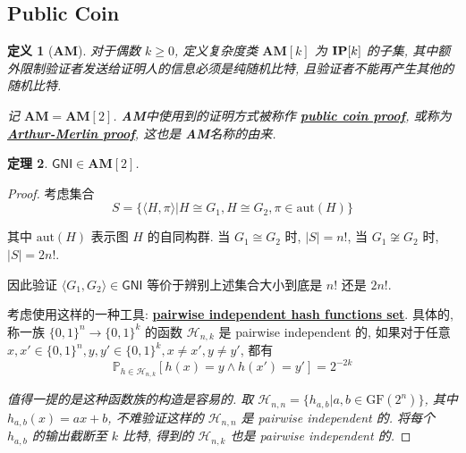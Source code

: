 \documentclass[8pt]{article}
\theoremstyle{compact}
\newtheorem{theorem}{定理}[section]
\newtheorem{definition}[theorem]{定义}
\def\obj#1{\textbf{\uline{#1}}}
\def\ge{\geqslant}
\begin{document}
\subsection{Public Coin}
\def\AM{\textbf{AM}}
\begin{definition}[\AM]
	对于偶数 $k \ge 0$, 定义复杂度类 $\AM[k]$ 为 $\textbf{IP}[k]$ 的子集, 其中额外限制验证者发送给证明人的信息必须是纯随机比特, 且验证者不能再产生其他的随机比特.

	记 $\AM = \AM[2]$. \AM 中使用到的证明方式被称作 \obj{public coin proof}, 或称为 \obj{Arthur-Merlin proof}, 这也是 \AM 名称的由来.
\end{definition}
\begin{theorem}
	$\textsf{GNI} \in \AM[2]$.
\end{theorem}
\begin{proof}
	考虑集合 $$S = \{\langle H, \pi \rangle | H \cong G_1, H \cong G_2, \pi \in \text{aut}(H)\}$$

	其中 $\text{aut}(H)$ 表示图 $H$ 的自同构群. 当 $G_1 \cong G_2$ 时, $|S| = n!$, 当 $G_1 \not\cong G_2$ 时, $|S| = 2n!$.

	因此验证 $\langle G_1, G_2 \rangle \in \textsf{GNI}$ 等价于辨别上述集合大小到底是 $n!$ 还是 $2n!$.

	考虑使用这样的一种工具: \obj{pairwise independent hash functions set}. 具体的, 称一族 $\{0, 1\}^n \to \{0, 1\}^k$ 的函数 $\mathcal H_{n, k}$ 是 pairwise independent 的, 如果对于任意 $x, x' \in \{0, 1\}^n, y, y' \in \{0, 1\}^k, x \neq x', y \neq y'$, 都有 $$\mathbb P_{h \in \mathcal H_{n, k}} [h(x) = y \wedge h(x') = y'] = 2^{-2k}$$

	\textit{值得一提的是这种函数族的构造是容易的. 取 $\mathcal H_{n, n} = \{h_{a, b} | a, b \in \text{GF}(2^n)\}$, 其中 $h_{a, b}(x) = ax + b$, 不难验证这样的 $\mathcal H_{n, n}$ 是 pairwise independent 的. 将每个 $h_{a, b}$ 的输出截断至 $k$ 比特, 得到的 $\mathcal H_{n, k}$ 也是 pairwise independent 的.}


\end{proof}
\end{document}
